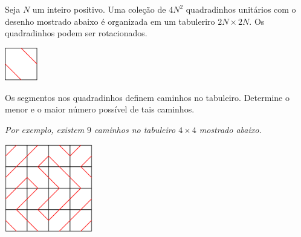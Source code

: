 Seja $N$ um inteiro positivo. Uma coleção de $4N^2$ quadradinhos unitários com o desenho mostrado abaixo é organizada em um tabuleriro $2N\times2N$. Os quadradinhos podem ser rotacionados.
\begin{center}
\includegraphics[width = 14.4mm]{img/fig0.png}
\end{center}
Os segmentos nos quadradinhos definem caminhos no tabuleiro. Determine o menor e o maior número possível de tais caminhos.

\textit{Por exemplo, existem $9$ caminhos no tabuleiro $4\times 4$ mostrado abaixo.}
\begin{center}
\includegraphics[width = 38.400000000000006mm]{img/fig1.png}
\end{center}
